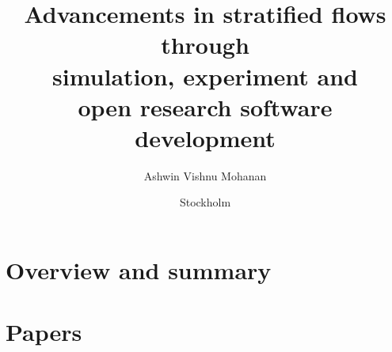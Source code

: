 \documentclass{./templates/mechthesis/MechThesis}
\title[%
  Advancements in stratified flows through simulation, experiment and open research software development%
]%
{%
  Advancements in stratified flows through \\ simulation, experiment and \\ open
  research software development%
}%
\author{Ashwin Vishnu Mohanan}%
\affiliation
{%
	Department of Mechanics, KTH Royal Institute of Technology,\\
	SE--100 44 Stockholm, Sweden%
}%
\date{Stockholm}{{August}}{{2019}}%
\begin{document}
%
\frontmatter



\printglossary
\printglossary[type=\acronymtype]
%
\mainmatter


\part{Overview and summary}

%
\begin{refsection}
  
\end{refsection}

%
\tocpagebreak


%
\part{Papers}

%
\makepapersummary
\cleardoublepage

%


\begin{refsection}
 
\end{refsection}

\begin{refsection}
 
\end{refsection}

\begin{refsection}
 
\end{refsection}
\end{document}
